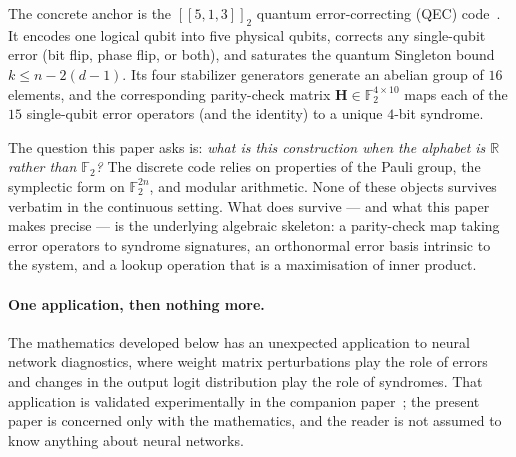 \documentclass[11pt,a4paper]{article}
\theoremstyle{definition}
\newcommand{\Hm}{\mathbf{H}}
\newcommand{\Rbb}{\mathbb{R}}
\newcommand{\Fbb}{\mathbb{F}}
\begin{document}
The concrete anchor is the $[\![5,1,3]\!]_2$ quantum error-correcting (QEC) code~\cite{Laflamme1996, Bennett1996, Knill1997}. It encodes one logical qubit into five physical qubits, corrects any single-qubit error (bit flip, phase flip, or both), and saturates the quantum Singleton bound~\cite{Singleton1964, Ekert1996} $k \leq n - 2(d-1)$. Its four stabilizer generators generate an abelian group of $16$ elements, and the corresponding parity-check matrix $\Hm\in\Fbb_2^{4\times 10}$ maps each of the $15$ single-qubit error operators (and the identity) to a unique $4$-bit syndrome.

The question this paper asks is: \emph{what is this construction when the alphabet is $\Rbb$ rather than $\Fbb_2$?} The discrete code relies on properties of the Pauli group, the symplectic form on $\Fbb_2^{2n}$, and modular arithmetic. None of these objects survives verbatim in the continuous setting. What does survive --- and what this paper makes precise --- is the underlying algebraic skeleton: a parity-check map taking error operators to syndrome signatures, an orthonormal error basis intrinsic to the system, and a lookup operation that is a maximisation of inner product.

\paragraph{One application, then nothing more.}
The mathematics developed below has an unexpected application to neural network diagnostics, where weight matrix perturbations play the role of errors and changes in the output logit distribution play the role of syndromes. That application is validated experimentally in the companion paper~\cite{ThreeModesLLM}; the present paper is concerned only with the mathematics, and the reader is not assumed to know anything about neural networks.
\end{document}
